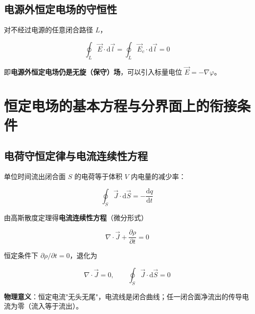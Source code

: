 \subsection{电源外恒定电场的守恒性}
对不经过电源的任意闭合路径 $L$，
\begin{formulaBox}
\[
\oint_L \vec{E}\cdot\mathrm{d}\vec{l}=\oint_L \vec{E}_c\cdot\mathrm{d}\vec{l}=0
\]
\end{formulaBox}
即\textbf{电源外恒定电场仍是无旋（保守）场}，可以引入标量电位 $\vec{E}=-\nabla\varphi$。


\section{恒定电场的基本方程与分界面上的衔接条件}

\subsection{电荷守恒定律与电流连续性方程}
单位时间流出闭合面 $S$ 的电荷等于体积 $V$ 内电量的减少率：
\begin{formulaBox}
\[
\oint_S \vec{J}\cdot\mathrm{d}\vec{S}=-\frac{\mathrm{d}q}{\mathrm{d}t}
\]
\end{formulaBox}
由高斯散度定理得\textbf{电流连续性方程}（微分形式）
\begin{formulaBox}
\[
\nabla\cdot\vec{J}+\frac{\partial\rho}{\partial t}=0
\]
\end{formulaBox}
恒定条件下 $\partial\rho/\partial t=0$，退化为
\begin{formulaBox}
\[
\nabla\cdot\vec{J}=0,\qquad \oint_S \vec{J}\cdot\mathrm{d}\vec{S}=0
\]
\end{formulaBox}
\textbf{物理意义}：恒定电流"无头无尾"，电流线是闭合曲线；任一闭合面净流出的传导电流为零（流入等于流出）。

